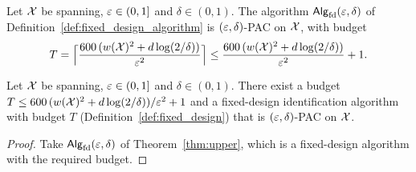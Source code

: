 \begin{theorem}\label{thm:upper}
\leanok
{}
Let $\mathcal{X}$ be spanning, $\varepsilon \in (0,1]$ and $\delta \in (0,1)$. The algorithm
$\mathsf{Alg}_{\mathrm{fd}}(\varepsilon,\delta)$
of Definition~\ref{def:fixed_design_algorithm} is $(\varepsilon,\delta)$-PAC on $\mathcal{X}$, with budget
\[
  T = \Big\lceil \frac{600\,(w(\mathcal{X})^2 + d\log(2/\delta))}{\varepsilon^2} \Big\rceil
  \le \frac{600\,(w(\mathcal{X})^2 + d\log(2/\delta))}{\varepsilon^2} + 1 .
\]
\end{theorem}

\begin{corollary}\label{cor:upper_exists}
\leanok
{}
Let $\mathcal{X}$ be spanning, $\varepsilon \in (0,1]$ and $\delta \in (0,1)$. There exist a budget
$T \le 600\,(w(\mathcal{X})^2 + d\log(2/\delta))/\varepsilon^2 + 1$ and a fixed-design identification
algorithm with budget $T$ (Definition~\ref{def:fixed_design}) that is $(\varepsilon,\delta)$-PAC on
$\mathcal{X}$.
\end{corollary}
\begin{proof}
\leanok
\leanok
{}
Take $\mathsf{Alg}_{\mathrm{fd}}(\varepsilon,\delta)$ of Theorem~\ref{thm:upper}, which is a fixed-design
algorithm with the required budget.
\end{proof}

